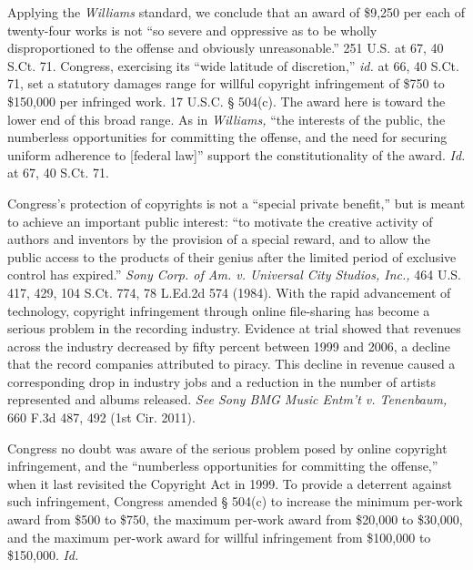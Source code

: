 Applying the \textit{Williams} standard, we conclude that an award of \$9,250
per each of twenty-four works is not ``so severe and oppressive as to be wholly
disproportioned to the offense and obviously unreasonable.'' 251 U.S. at 67, 40
S.Ct. 71. Congress, exercising its ``wide latitude of discretion,''
\textit{id.} at 66, 40 S.Ct. 71, set a statutory damages range for willful
copyright infringement of \$750 to \$150,000 per infringed work. 17 U.S.C. {\S}
504(c). The award here is toward the lower end of this broad range. As in
\textit{Williams,} ``the interests of the public, the numberless opportunities
for committing the offense, and the need for securing uniform adherence to
[federal law]'' support the constitutionality of the award. \textit{Id.} at 67,
40 S.Ct. 71.

Congress's protection of copyrights is not a ``special private benefit,'' but is
meant to achieve an important public interest: ``to motivate the creative
activity of authors and inventors by the provision of a special reward, and to
allow the public access to the products of their genius after the limited
period of exclusive control has expired.'' \textit{Sony Corp. of Am. v.
Universal City Studios, Inc.,} 464 U.S. 417, 429, 104 S.Ct. 774, 78 L.Ed.2d 574
(1984). With the rapid advancement of technology, copyright infringement
through online file-sharing has become a serious problem in the recording
industry. Evidence at trial showed that revenues across the industry decreased
by fifty percent between 1999 and 2006, a decline that the record companies
attributed to piracy. This decline in revenue caused a corresponding drop in
industry jobs and a reduction in the number of artists represented and albums
released. \textit{See Sony BMG Music Entm't v. Tenenbaum,} 660 F.3d 487, 492
(1st Cir. 2011).

Congress no doubt was aware of the serious problem posed by online copyright
infringement, and the ``numberless opportunities for committing the offense,''
when it last revisited the Copyright Act in 1999. To provide a deterrent
against such infringement, Congress amended {\S} 504(c) to increase the minimum
per-work award from \$500 to \$750, the maximum per-work award from \$20,000 to
\$30,000, and the maximum per-work award for willful infringement from
\$100,000 to \$150,000. \textit{Id.}

